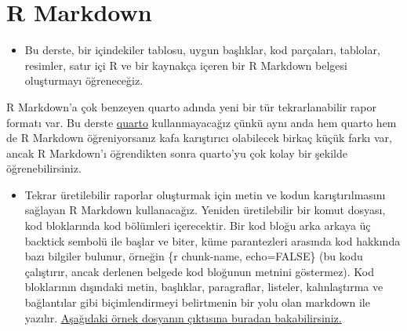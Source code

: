 \documentclass[
  oneside]{book}
\providecommand{\tightlist}{%
  \setlength{\itemsep}{0pt}\setlength{\parskip}{0pt}}
\begin{document}
\hypertarget{r-markdown}{%
\section{R Markdown}\label{r-markdown}}

\begin{itemize}
\tightlist
\item
  Bu derste, bir içindekiler tablosu, uygun başlıklar, kod parçaları, tablolar, resimler, satır içi R ve bir kaynakça içeren bir R Markdown belgesi oluşturmayı öğreneceğiz.
\end{itemize}

\begin{info}
R Markdown'a çok benzeyen quarto adında yeni bir tür tekrarlanabilir rapor formatı var. Bu derste \href{https://quarto.org/}{quarto} kullanmayacağız çünkü aynı anda hem quarto hem de R Markdown öğreniyorsanız kafa karıştırıcı olabilecek birkaç küçük farkı var, ancak R Markdown'ı öğrendikten sonra quarto'yu çok kolay bir şekilde öğrenebilirsiniz.

\end{info}

\begin{itemize}
\tightlist
\item
  Tekrar üretilebilir raporlar oluşturmak için metin ve kodun karıştırılmasını sağlayan R Markdown kullanacağız. Yeniden üretilebilir bir komut dosyası, kod bloklarında kod bölümleri içerecektir. Bir kod bloğu arka arkaya üç backtick sembolü ile başlar ve biter, küme parantezleri arasında kod hakkında bazı bilgiler bulunur, örneğin \{r chunk-name, echo=FALSE\} (bu kodu çalıştırır, ancak derlenen belgede kod bloğunun metnini göstermez). Kod bloklarının dışındaki metin, başlıklar, paragraflar, listeler, kalınlaştırma ve bağlantılar gibi biçimlendirmeyi belirtmenin bir yolu olan markdown ile yazılır. \href{docs/veri-üretim.html}{Aşağıdaki örnek dosyanın çıktısına buradan bakabilirsiniz.}
\end{itemize}
\end{document}
